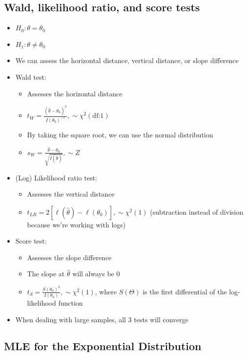 \documentclass{article}
\begin{document}
\subsection{Wald, likelihood ratio, and score tests}

\begin{itemize}
    \item $H_0: \theta=\theta_0$
    \item $H_1: \theta \ne \theta_0$
    \item We can assess the horizontal distance, vertical distance, or slope difference
    \item Wald test:
    \begin{itemize}
        \item Assesses the horizontal distance
        \item $t_W=\frac{(\hat{\theta}-\theta_0)^2}{I(\theta_0)^{-1}}, \sim \chi ^2(\text{df:}1)$
        \item By taking the square root, we can use the normal distribution
        \item $s_W=\frac{\hat{\theta}-\theta_0}{\sqrt{I(\hat{\theta})}}, \sim Z$
    \end{itemize}
    \item (Log) Likelihood ratio test:
    \begin{itemize}
        \item Assesses the vertical distance
        \item $t_{LR}=2[\ell (\hat{\theta}) - \ell (\theta_0)], \sim \chi^2(1)$ (subtraction instead of division because we're working with logs)
    \end{itemize}
    \item Score test:
    \begin{itemize}
        \item Assesses the slope difference
        \item The slope at $\hat{\theta}$ will always be $0$
        \item $t_S=\frac{S(\theta_0)^2}{I(\theta_0)}, \sim \chi^2(1)$, where $S(\Theta)$ is the first differential of the log-likelihood function
    \end{itemize}
    \item When dealing with large samples, all 3 tests will converge
\end{itemize}

\subsection{MLE for the Exponential Distribution}
\end{document}
